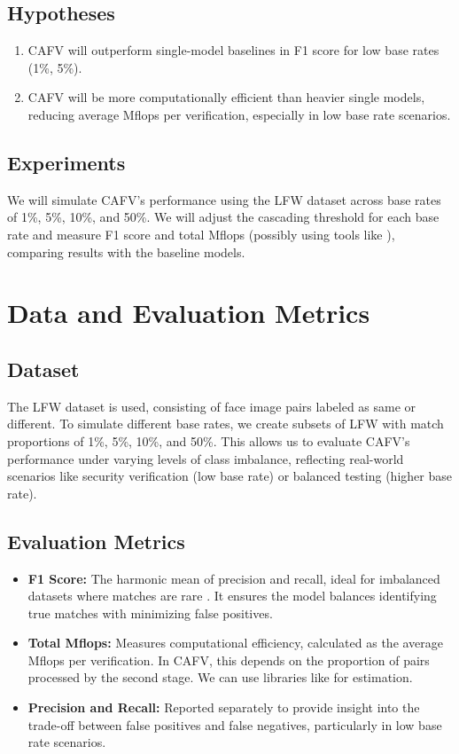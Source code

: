 \documentclass[times,10pt,twocolumn]{article}
\begin{document}
\subsection{Hypotheses}
\begin{enumerate}
    \item CAFV will outperform single-model baselines in F1 score for low base rates (1\%, 5\%).
    \item CAFV will be more computationally efficient than heavier single models, reducing average Mflops per verification, especially in low base rate scenarios.
\end{enumerate}

\subsection{Experiments}
We will simulate CAFV's performance using the LFW dataset \cite{LFWdataset} across base rates of 1\%, 5\%, 10\%, and 50\%. We will adjust the cascading threshold for each base rate and measure F1 score and total Mflops (possibly using tools like \cite{thop}), comparing results with the baseline models.

\section{Data and Evaluation Metrics}

\subsection{Dataset}
The LFW dataset \cite{LFWdataset} is used, consisting of face image pairs labeled as same or different. To simulate different base rates, we create subsets of LFW with match proportions of 1\%, 5\%, 10\%, and 50\%. This allows us to evaluate CAFV's performance under varying levels of class imbalance, reflecting real-world scenarios like security verification (low base rate) or balanced testing (higher base rate).

\subsection{Evaluation Metrics}
\begin{itemize}
    \item \textbf{F1 Score:} The harmonic mean of precision and recall, ideal for imbalanced datasets where matches are rare \cite{imbalancedlearning}. It ensures the model balances identifying true matches with minimizing false positives.
    \item \textbf{Total Mflops:} Measures computational efficiency, calculated as the average Mflops per verification. In CAFV, this depends on the proportion of pairs processed by the second stage. We can use libraries like \cite{thop} for estimation.
    \item \textbf{Precision and Recall:} Reported separately to provide insight into the trade-off between false positives and false negatives, particularly in low base rate scenarios.
\end{itemize}
\end{document}
